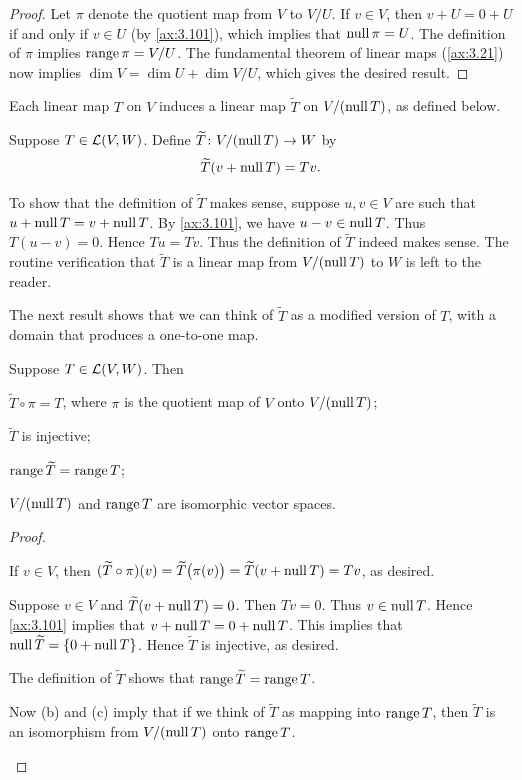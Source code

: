 \begin{proof}
Let $\pi$ denote the quotient map from $V$ to $V/U$. If $v\in V$, then
$v+U=0+U$ if and only if $v\in U$ (by \ref{ax:3.101}), which implies that
$\operatorname{null}\pi=U$. The definition of $\pi$ implies $\operatorname{range}\pi=V/U$. The fundamental
theorem of linear maps (\ref{ax:3.21}) now implies $\dim V=\dim U+\dim V/U$,
which gives the desired result.
\end{proof}

Each linear map $T$ on $V$ induces a linear map $\widetilde{T}$ on
$V/(\operatorname{null} T)$, as defined below.

\begin{notation}[$\widetilde{T}$]\label{ax:3.106}
Suppose $T\in\mathcal{L}(V,W)$. Define $\widetilde{T}\colon V/(\nul T)\to W$ by
\[ \widetilde{T}(v+\nul T) = Tv. \]
\end{notation}

To show that the definition of $\widetilde{T}$ makes sense, suppose $u,v\in V$
are such that $u+\operatorname{null} T=v+\operatorname{null} T$. By \ref{ax:3.101}, we have $u-v\in\operatorname{null} T$.
Thus $T(u-v)=0$. Hence $Tu=Tv$. Thus the definition of $\widetilde{T}$ indeed
makes sense. The routine verification that $\widetilde{T}$ is a linear map from
$V/(\operatorname{null} T)$ to $W$ is left to the reader.

The next result shows that we can think of $\widetilde{T}$ as a modified version
of $T$, with a domain that produces a one-to-one map.

\begin{result}\label{ax:3.107}
Suppose $T\in\mathcal{L}(V,W)$. Then
\begin{parts}
\item $\widetilde{T}\circ\pi=T$, where $\pi$ is the quotient map of $V$ onto
  $V/(\operatorname{null} T)$;
\item $\widetilde{T}$ is injective;
\item $\range\widetilde{T}=\range T$;
\item $V/(\operatorname{null} T)$ and $\operatorname{range} T$ are isomorphic vector spaces.
\end{parts}
\end{result}

\begin{proof}\leavevmode
\begin{parts}
\item If $v\in V$, then $(\widetilde{T}\circ\pi)(v)=\widetilde{T}\bigl(\pi(v)\bigr)
  =\widetilde{T}(v+\nul T)=Tv$, as desired.
\item Suppose $v\in V$ and $\widetilde{T}(v+\nul T)=0$. Then $Tv=0$. Thus
  $v\in\operatorname{null} T$. Hence \ref{ax:3.101} implies that $v+\operatorname{null} T=0+\operatorname{null} T$. This
  implies that $\nul\widetilde{T}=\{0+\nul T\}$. Hence $\widetilde{T}$ is
  injective, as desired.
\item The definition of $\widetilde{T}$ shows that
  $\range\widetilde{T}=\range T$.
\item Now (b) and (c) imply that if we think of $\widetilde{T}$ as mapping into
  $\operatorname{range} T$, then $\widetilde{T}$ is an isomorphism from $V/(\operatorname{null} T)$ onto
  $\operatorname{range} T$. \qedhere
\end{parts}
\end{proof}

